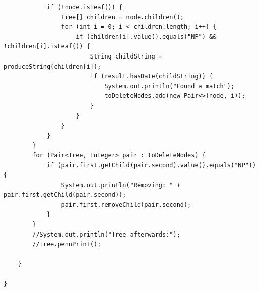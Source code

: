 \begin{lstlisting}
            if (!node.isLeaf()) {
                Tree[] children = node.children();
                for (int i = 0; i < children.length; i++) {
                    if (children[i].value().equals("NP") && !children[i].isLeaf()) {
                        String childString = produceString(children[i]);
                        if (result.hasDate(childString)) {
                            System.out.println("Found a match");
                            toDeleteNodes.add(new Pair<>(node, i));
                        }
                    }
                }
            }
        }
        for (Pair<Tree, Integer> pair : toDeleteNodes) {
            if (pair.first.getChild(pair.second).value().equals("NP")) {
                System.out.println("Removing: " + pair.first.getChild(pair.second));
                pair.first.removeChild(pair.second);
            }
        }
        //System.out.println("Tree afterwards:");
        //tree.pennPrint();

    }

}

\end{lstlisting}
